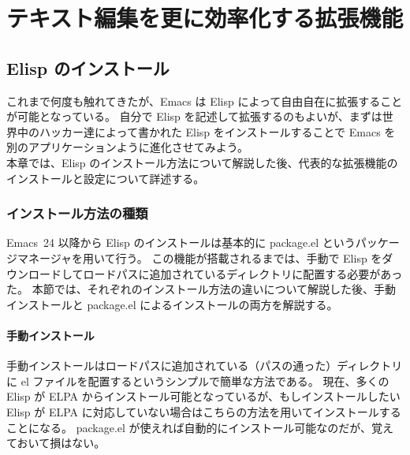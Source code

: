\chapter{テキスト編集を更に効率化する拡張機能}
\section{Elisp のインストール}
これまで何度も触れてきたが、Emacs は Elisp によって自由自在に拡張することが可能となっている。
自分で Elisp を記述して拡張するのもよいが、まずは世界中のハッカー達によって書かれた Elisp をインストールすることで Emacs を別のアプリケーションように進化させてみよう。\\

本章では、Elisp のインストール方法について解説した後、代表的な拡張機能のインストールと設定について詳述する。
\subsection{インストール方法の種類}
Emacs~24 以降から Elisp のインストールは基本的に package.el というパッケージマネージャを用いて行う。
この機能が搭載されるまでは、手動で Elisp をダウンロードしてロードパスに追加されているディレクトリに配置する必要があった。
本節では、それぞれのインストール方法の違いについて解説した後、手動インストールと package.el によるインストールの両方を解説する。
\subsubsection{手動インストール}
手動インストールはロードパスに追加されている（パスの通った）ディレクトリに el ファイルを配置するというシンプルで簡単な方法である。
現在、多くの Elisp が ELPA からインストール可能となっているが、もしインストールしたい Elisp が ELPA に対応していない場合はこちらの方法を用いてインストールすることになる。
package.el が使えれば自動的にインストール可能なのだが、覚えておいて損はない。
